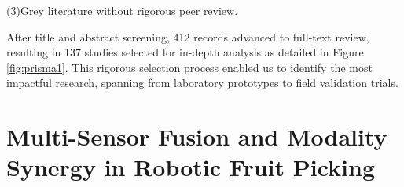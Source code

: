 \documentclass{ieeeaccess}
\begin{document}
(3)Grey literature without rigorous peer review.

After title and abstract screening, 412 records advanced to full-text review, resulting in 137 studies selected for in-depth analysis as detailed in Figure \ref{fig:prisma1}. This rigorous selection process enabled us to identify the most impactful research, spanning from laboratory prototypes to field validation trials. 



\section{Multi-Sensor Fusion and Modality Synergy in Robotic Fruit Picking}
\end{document}
